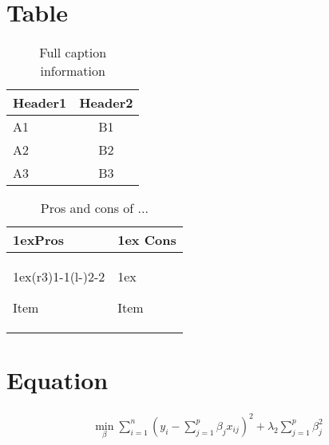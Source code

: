 \section{Table}

\begin{table}[h]
	\centering
	\caption[Table info in LoT]{Full caption information}
	\label{tbl:referenceToTable1}
	\begin{tabularx}{0.5\textwidth}{X | c}
	\multicolumn{1}{c}{\textbf{Header1}} &  \multicolumn{1}{c}{\textbf{Header2}} \\ \hline
	  A1 & B1 \\
	  A2 & B2 \\
	  A3 & B3
	\end{tabularx}
\end{table}

\begin{table}[H]
	\caption{Pros and cons of ...}
	\label{tbl:referenceToTable2}
    \begin{tabularx}{\linewidth}{>{\parskip1ex}X@{\kern4\tabcolsep}>{\parskip1ex}X}
        \toprule
        \hfil\bfseries Pros
        &
        \hfil\bfseries Cons
        \\\cmidrule(r{3\tabcolsep}){1-1}\cmidrule(l{-\tabcolsep}){2-2}
        
        Item \par
        
        &
        
        Item \par
        
        \\\bottomrule
    \end{tabularx}
\end{table}


\section{Equation}

\begin{equation} 
    \label{eq:referenceToEq1}
	\begin{gathered}
		\min_\beta \sum_{i=1}^n \left( y_i - \sum_{j=1}^p \beta_j x_{ij} \right)^2 + \lambda_2 \sum_{j=1}^p \beta_j^2
	\end{gathered}
\end{equation}

